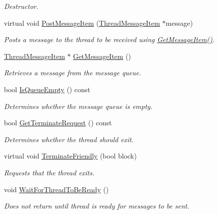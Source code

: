 \begin{DoxyCompactItemize}
\begin{DoxyCompactList}\small\item\em Destructor. \item\end{DoxyCompactList}\item 
virtual void \hyperlink{class_thread_single_message_af5816a537c68ced255d2d8331a1ab641}{PostMessageItem} (\hyperlink{class_thread_message_item}{ThreadMessageItem} $\ast$message)
\begin{DoxyCompactList}\small\item\em Posts a message to the thread to be received using \hyperlink{class_thread_single_message_ac6385cefd086e9c40aa28241caa08d09}{GetMessageItem()}. \item\end{DoxyCompactList}\item 
\hyperlink{class_thread_message_item}{ThreadMessageItem} $\ast$ \hyperlink{class_thread_single_message_ac6385cefd086e9c40aa28241caa08d09}{GetMessageItem} ()
\begin{DoxyCompactList}\small\item\em Retrieves a message from the message queue. \item\end{DoxyCompactList}\item 
bool \hyperlink{class_thread_single_message_ad7e22cff6fc4a778b7dcd208a1678f9b}{IsQueueEmpty} () const 
\begin{DoxyCompactList}\small\item\em Determines whether the message queue is empty. \item\end{DoxyCompactList}\item 
bool \hyperlink{class_thread_single_message_a44b112ebedfba5e48ca8384a2db24061}{GetTerminateRequest} () const 
\begin{DoxyCompactList}\small\item\em Determines whether the thread should exit. \item\end{DoxyCompactList}\item 
virtual void \hyperlink{class_thread_single_message_a070c58a93f28c1a2514506c55e1810fb}{TerminateFriendly} (bool block)
\begin{DoxyCompactList}\small\item\em Requests that the thread exits. \item\end{DoxyCompactList}\item 
\hypertarget{class_thread_single_message_a63c92021e21e3c06512fabad7e3c7a91}{
void \hyperlink{class_thread_single_message_a63c92021e21e3c06512fabad7e3c7a91}{WaitForThreadToBeReady} ()}
\label{class_thread_single_message_a63c92021e21e3c06512fabad7e3c7a91}

\begin{DoxyCompactList}\small\item\em Does not return until thread is ready for messages to be sent. \item\end{DoxyCompactList}\end{DoxyCompactItemize}
